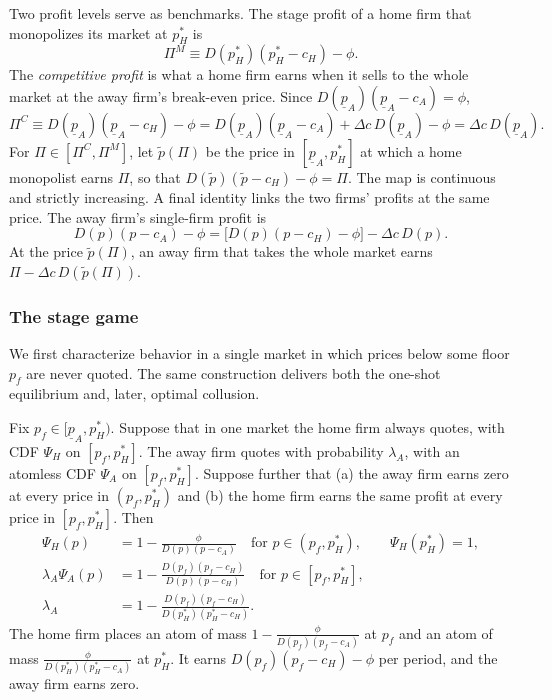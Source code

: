 Two profit levels serve as benchmarks. The stage profit of a home firm that monopolizes its market at $p_H^*$
is
\begin{equation}\label{eq:13-bm-PiM}
\Pi^M\equiv D(p_H^*)(p_H^*-c_H)-\phi .
\end{equation}
The \emph{competitive profit} is what a home firm earns when it sells to the whole market at the away firm's
break-even price. Since $D(\underline p_A)(\underline p_A-c_A)=\phi$,
\begin{equation}\label{eq:13-bm-PiC}
\Pi^C\equiv D(\underline p_A)(\underline p_A-c_H)-\phi
=D(\underline p_A)(\underline p_A-c_A)+\Delta c\,D(\underline p_A)-\phi=\Delta c\,D(\underline p_A).
\end{equation}
For $\Pi\in[\Pi^C,\Pi^M]$, let $\tilde p(\Pi)$ be the price in $[\underline p_A,p_H^*]$ at which a home
monopolist earns $\Pi$, so that $D(\tilde p)(\tilde p-c_H)-\phi=\Pi$. The map is continuous and strictly
increasing. A final identity links the two firms' profits at the same price. The away firm's single-firm
profit is
\begin{equation}\label{eq:13-bm-identity}
D(p)(p-c_A)-\phi=\bigl[D(p)(p-c_H)-\phi\bigr]-\Delta c\,D(p).
\end{equation}
At the price $\tilde p(\Pi)$, an away firm that takes the whole market earns $\Pi-\Delta c\,D(\tilde p(\Pi))$.

\subsubsection{The stage game}

We first characterize behavior in a single market in which prices below some floor $p_f$ are never quoted.
The same construction delivers both the one-shot equilibrium and, later, optimal collusion.

\begin{lemma}\label{lem:13-bm-floor}
Fix $p_f\in[\underline p_A,p_H^*)$. Suppose that in one market the home firm always quotes, with CDF $\Psi_H$
on $[p_f,p_H^*]$. The away firm quotes with probability $\lambda_A$, with an atomless CDF $\Psi_A$ on
$[p_f,p_H^*]$. Suppose further that (a) the away firm earns zero at every price in $(p_f,p_H^*)$ and (b) the
home firm earns the same profit at every price in $[p_f,p_H^*]$. Then
\begin{align}
\Psi_H(p)&=1-\frac{\phi}{D(p)(p-c_A)}\quad\text{for }p\in(p_f,p_H^*),\qquad\Psi_H(p_H^*)=1,
\label{eq:13-bm-psiH}\\
\lambda_A\Psi_A(p)&=1-\frac{D(p_f)(p_f-c_H)}{D(p)(p-c_H)}\quad\text{for }p\in[p_f,p_H^*],
\label{eq:13-bm-psiA}\\
\lambda_A&=1-\frac{D(p_f)(p_f-c_H)}{D(p_H^*)(p_H^*-c_H)} .\label{eq:13-bm-lambda}
\end{align}
The home firm places an atom of mass $1-\frac{\phi}{D(p_f)(p_f-c_A)}$ at $p_f$ and an atom of mass
$\frac{\phi}{D(p_H^*)(p_H^*-c_A)}$ at $p_H^*$. It earns $D(p_f)(p_f-c_H)-\phi$ per period, and the away firm
earns zero.
\end{lemma}

